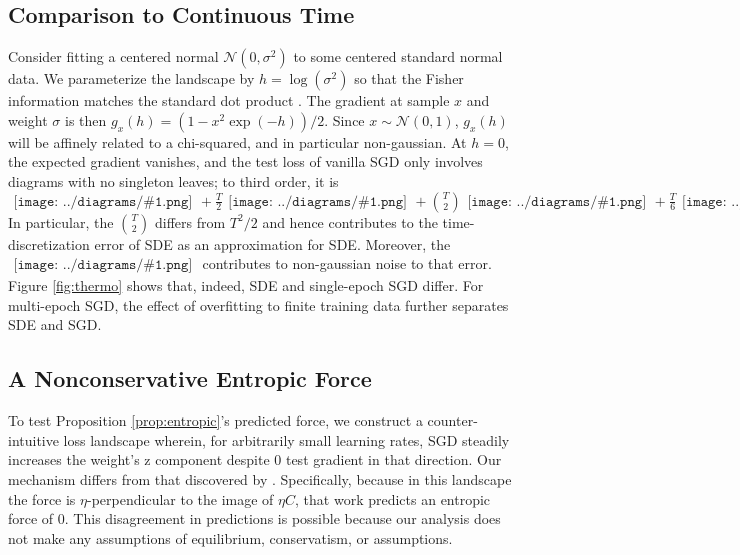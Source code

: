 \documentclass{article}
\newcommand{\Nn}{\mathcal{N}}
\newcommand{\sdia}[1]{\begin{gathered}\texttt{[image: ../diagrams/\#1.png]}\end{gathered}}
\begin{document}

    \subsection{Comparison to Continuous Time}
        Consider fitting a centered normal $\Nn(0, \sigma^2)$ to some centered
        standard normal data.  We parameterize the landscape by
        $h=\log(\sigma^2)$ so that the Fisher information matches the standard
        dot product \citet{am98}.  The gradient at sample $x$ and weight
        $\sigma$ is then $g_x(h) = (1-x^2\exp(-h))/2$.  Since $x\sim \Nn(0,
        1)$, $g_x(h)$ will be affinely related to a chi-squared, and in
        particular non-gaussian.  At $h=0$, the expected gradient vanishes, and
        the test loss of vanilla SGD only involves diagrams with no singleton
        leaves; to third order, it is
        $
            \sdia{(0)()}
            +\frac{T}{2} \sdia{c(01-2)(02-12)}
            +{T\choose 2} \sdia{c(03-1-2)(01-12-23)}
            +\frac{T}{6} \sdia{c(012-3)(03-13-23)}
        $
        In particular, the ${T\choose 2}$ differs from $T^2/2$ and hence
        contributes to the time-discretization error of SDE as an approximation
        for SDE.  Moreover, the $\sdia{c(012-3)(03-13-23)}$ contributes to
        non-gaussian noise to that error.  Figure \ref{fig:thermo} shows that,
        indeed, SDE and single-epoch SGD differ.  For multi-epoch SGD, the
        effect of overfitting to finite training data further separates SDE and
        SGD.


    \subsection{A Nonconservative Entropic Force} \label{subsect:entropic}
        To test Proposition \ref{prop:entropic}'s predicted force, 
        we construct a counter-intuitive loss landscape wherein, for
        arbitrarily small learning rates, SGD steadily increases the weight's
        z component despite 0 test gradient in that direction.
        Our mechanism differs from that discovered by \citet{ch18}.
        Specifically, because in this landscape the force is
        $\eta$-perpendicular to the image of $\eta C$, that work predicts an
        entropic force of $0$.  This disagreement in predictions is possible
        because our analysis does not make any assumptions of equilibrium,
        conservatism, or assumptions.
        
\end{document}
